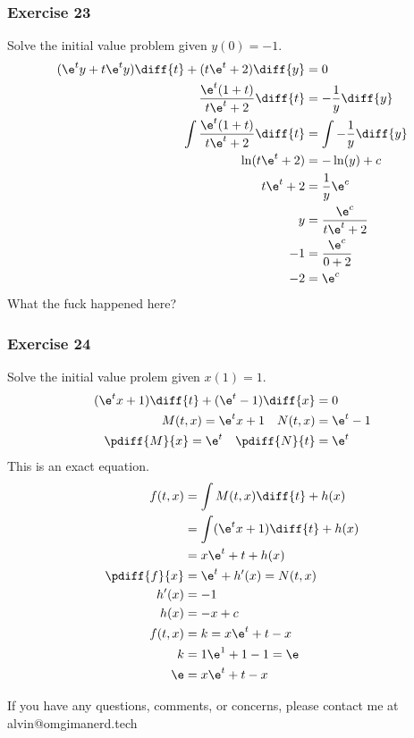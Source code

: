 \documentclass{math}
\begin{document}
\subsubsection*{Exercise 23}
Solve the initial value problem given \( y(0) = -1 \).
\begin{align*}
  (\e^ty+t\e^ty)\diff{t}+(t\e^t+2)\diff{y} &= 0 \\
  \frac{\e^t(1+t)}{t\e^t+2}\diff{t} &= -\frac{1}{y}\diff{y} \\
  \int\frac{\e^t(1+t)}{t\e^t+2}\diff{t} &= \int-\frac{1}{y}\diff{y} \\
  \ln(t\e^t+2) &= -\ln(y)+c \\
  t\e^t+2 &= \frac{1}{y}\e^c \\
  y &= \frac{\e^c}{t\e^t+2} \\
  -1 &= \frac{\e^c}{0+2} \\
  -2 &= \e^c \\
\end{align*}
What the fuck happened here?

\subsubsection*{Exercise 24}
Solve the initial value prolem given \( x(1) = 1 \).
\begin{align*}
  (\e^tx+1)\diff{t}+(\e^t-1)\diff{x} &= 0 \\
  M(t,x) = \e^tx+1 \quad N(t,x) &= \e^t-1 \\
  \pdiff{M}{x} = \e^t \quad \pdiff{N}{t} &= \e^t \\
\end{align*}
This is an exact equation.
\begin{align*}
  f(t,x) &= \int M(t,x)\diff{t}+h(x) \\
  &= \int(\e^tx+1)\diff{t}+h(x) \\
  &= x\e^t+t+h(x) \\
  \pdiff{f}{x} &= \e^t+h'(x) = N(t,x) \\
  h'(x) &= -1 \\
  h(x) &= -x+c \\
  f(t,x) &= k = x\e^t+t-x \\
  k &= 1\e^1+1-1 = \e \\
  \e &= x\e^t+t-x
\end{align*}

\begin{center}
  If you have any questions, comments, or concerns, please contact me at
  alvin@omgimanerd.tech
\end{center}
\end{document}
